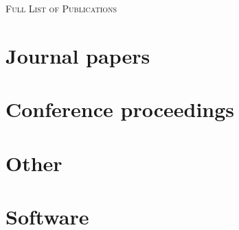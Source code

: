 \pagebreak

\noindent
{\fontsize{18}{18}\selectfont\scshape Full List of Publications} 

\section{Journal papers}


\section{Conference proceedings}

\section{Other}

\section{Software}
